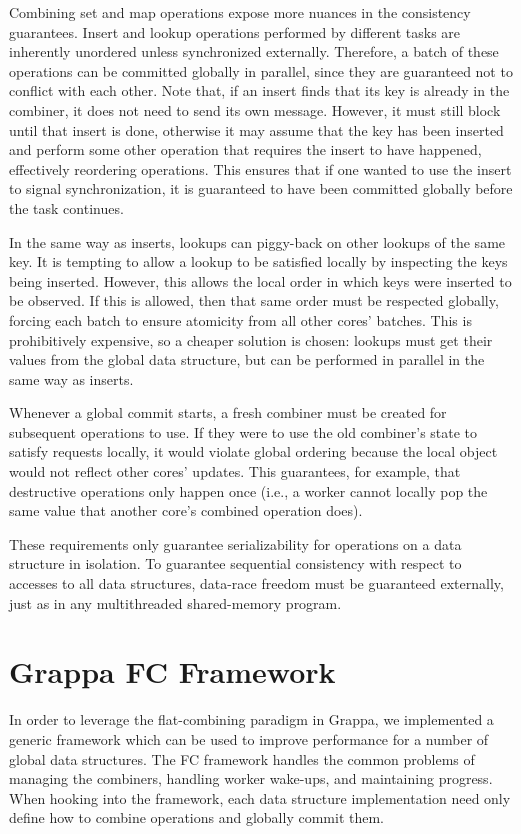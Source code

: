 Combining set and map operations expose more nuances in the consistency guarantees.
Insert and lookup operations performed by different tasks are inherently unordered unless synchronized externally.
Therefore, a batch of these operations can be committed globally in parallel, since they are guaranteed not to conflict with each other.
Note that, if an insert finds that its key is already in the combiner, it does not need to send its own message. However, it must still block until that insert is done, otherwise it may assume that the key has been inserted and perform some other operation that requires the insert to have happened, effectively reordering operations.
This ensures that if one wanted to use the insert to signal synchronization, it is guaranteed to have been committed globally before the task continues.

In the same way as inserts, lookups can piggy-back on other lookups of the same key.
It is tempting to allow a lookup to be satisfied locally by inspecting the keys being inserted.
However, this allows the local order in which keys were inserted to be observed.
If this is allowed, then that same order must be respected globally, forcing each batch to ensure atomicity from all other cores' batches. This is prohibitively expensive, so a cheaper solution is chosen: lookups must get their values from the global data structure, but can be performed in parallel in the same way as inserts.

Whenever a global commit starts, a fresh combiner must be created for subsequent operations to use. If they were to use the old combiner's state to satisfy requests locally, it would violate global ordering because the local object would not reflect other cores' updates. This guarantees, for example, that destructive operations only happen once (i.e., a worker cannot locally pop the same value that another core's combined operation does).

These requirements only guarantee serializability for operations on a data structure in isolation. To guarantee sequential consistency with respect to accesses to all data structures, data-race freedom  must be guaranteed externally, just as in any multithreaded shared-memory program.

\section{Grappa FC Framework}
In order to leverage the flat-combining paradigm in Grappa, we implemented a generic framework which can be used to improve performance for a number of global data structures. The FC framework handles the common problems of managing the combiners, handling worker wake-ups, and maintaining progress. When hooking into the framework, each data structure implementation need only define how to combine operations and globally commit them.


